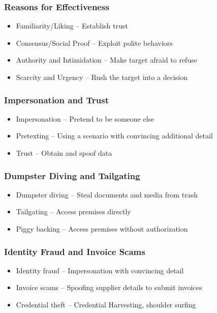 		\subsubsection {Reasons for Effectiveness}
			\begin{itemize}
				\item Familiarity/Liking -- Establish trust
				\item Consensus/Social Proof -- Exploit polite behaviors
				\item Authority and Intimidation -- Make target afraid to refuse
				\item Scarcity and Urgency -- Rush the target into a decision
			\end{itemize}
		\subsubsection {Impersonation and Trust}
			\begin{itemize}
				\item Impersonation -- Pretend to be someone else
				\item Pretexting -- Using a scenario with convincing additional detail
				\item Trust -- Obtain and spoof data
			\end{itemize}
		\subsubsection {Dumpster Diving and Tailgating}
			\begin{itemize}
				\item Dumpster diving -- Steal documents and media from trash
				\item Tailgating -- Access premises directly
				\item Piggy backing -- Access premises without authorization
			\end{itemize}
		\subsubsection {Identity Fraud and Invoice Scams}
			\begin{itemize}
				\item Identity fraud -- Impersonation with convincing detail
				\item Invoice scams -- Spoofing supplier details to submit invoices
				\item Credential theft -- Credential Harvesting, shoulder surfing
			\end{itemize}

